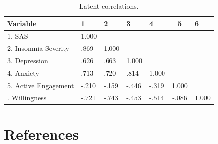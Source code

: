 \documentclass[
  letterpaper,
  DIV=11,
  numbers=noendperiod]{scrreprt}
\begin{document}
\begin{table}

\caption{Latent correlations.}
\centering
\begin{tabular}[t]{lllllcl}
\toprule
Variable & 1 & 2 & 3 & 4 & 5 & 6\\
\midrule
1. SAS & 1.000 &  &  &  &  & \\
2. Insomnia Severity & .869 & 1.000 &  &  &  & \\
3. Depression & .626 & .663 & 1.000 &  &  & \\
4. Anxiety & .713 & .720 & .814 & 1.000 &  & \\
5. Active Engagement & -.210 & -.159 & -.446 & -.319 & 1.000 & \\
\addlinespace
6. Willingness & -.721 & -.743 & -.453 & -.514 & -.086 & 1.000\\
\bottomrule
\end{tabular}
\end{table}


\hypertarget{references}{%
\chapter*{References}\label{references}}

\end{document}
